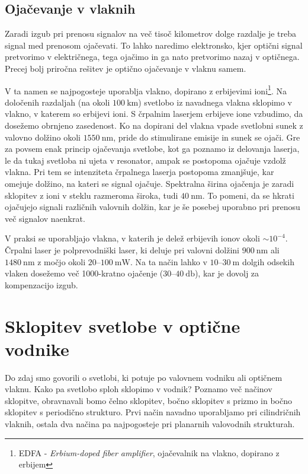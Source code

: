 \subsection*{Ojačevanje v vlaknih}
Zaradi izgub pri prenosu signalov na več tisoč kilometrov dolge razdalje 
je treba signal med prenosom ojačevati. To lahko naredimo elektronsko, kjer optični signal 
pretvorimo v električnega, tega ojačimo in ga nato pretvorimo nazaj v optičnega. 
Precej bolj priročna rešitev je optično ojačevanje v vlaknu samem. 

V ta namen se najpogosteje uporablja vlakno, dopirano z erbijevimi 
ioni\footnote{EDFA - {\it Erbium-doped fiber amplifier}, 
ojačevalnik na vlakno, dopirano z erbijem}. 
Na določenih razdaljah (na okoli $100~\si{\kilo\meter}$) svetlobo iz navadnega vlakna 
sklopimo v vlakno, v katerem so erbijevi ioni.
S črpalnim laserjem erbijeve ione vzbudimo, da dosežemo obrnjeno zasedenost. 
Ko na dopirani del vlakna vpade svetlobni sunek z valovno dolžino okoli 
$1550~\si{\nano\meter}$, pride do stimulirane emisije in 
sunek se ojači. Gre za povsem enak princip ojačevanja svetlobe, kot ga poznamo iz 
delovanja laserja, le da tukaj svetloba ni ujeta v resonator, ampak se postopoma 
ojačuje vzdolž vlakna. Pri tem se intenziteta črpalnega laserja postopoma zmanjšuje,
kar omejuje dolžino, na kateri se signal ojačuje.
Spektralna širina ojačenja je zaradi sklopitev z ioni v steklu 
razmeroma široka, tudi $40~\si{\nano\meter}$. To pomeni, da se hkrati ojačujejo signali različnih 
valovnih dolžin, kar je še posebej uporabno pri prenosu več signalov naenkrat.

V praksi se uporabljajo vlakna, v katerih je delež erbijevih ionov okoli $\sim 10^{-4}$. 
Črpalni laser je polprevodniški laser, ki 
deluje pri valovni dolžini $900~\si{\nano\meter}$ ali $1480~\si{\nano\meter}$ 
z močjo okoli $20$--$100~\si{\milli\watt}$. Na ta način lahko v $10$--$30~\si{\meter}$
dolgih odsekih vlaken dosežemo več 1000-kratno ojačenje ($30$--$40~\si{\decibel}$), kar 
je dovolj za kompenzacijo izgub.

\section{Sklopitev svetlobe v optične vodnike}
Do zdaj smo govorili o svetlobi, ki potuje po valovnem vodniku ali optičnem vlaknu. Kako pa 
svetlobo sploh sklopimo v vodnik? Poznamo več načinov sklopitve, obravnavali bomo 
čelno sklopitev, bočno sklopitev s prizmo in bočno sklopitev s periodično strukturo.
Prvi način navadno uporabljamo pri 
cilindričnih vlaknih, ostala dva načina pa najpogosteje pri planarnih valovodnih strukturah.

